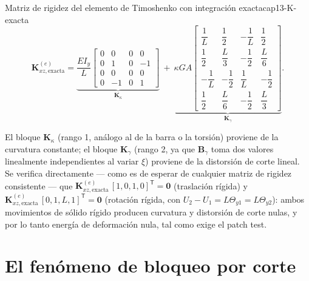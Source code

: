 \begin{ecnimportante}{Matriz de rigidez del elemento de Timoshenko con integración exacta}{cap13-K-exacta}
\[
\bm K^{(e)}_{xz,\text{exacta}} =
\underbrace{\frac{EI_y}{L}\begin{bmatrix}0&0&0&0\\0&1&0&-1\\0&0&0&0\\0&-1&0&1\end{bmatrix}}_{\bm K_\kappa}
\ +\
\underbrace{\kappa GA\begin{bmatrix}
\dfrac1L & \dfrac12 & -\dfrac1L & \dfrac12 \\[4pt]
\dfrac12 & \dfrac{L}{3} & -\dfrac12 & \dfrac{L}{6} \\[4pt]
-\dfrac1L & -\dfrac12 & \dfrac1L & -\dfrac12 \\[4pt]
\dfrac12 & \dfrac{L}{6} & -\dfrac12 & \dfrac{L}{3}
\end{bmatrix}}_{\bm K_\gamma} .
\]
\end{ecnimportante}

El bloque $\bm K_\kappa$ (rango 1, análogo al de la barra o la torsión) proviene de la curvatura constante; el bloque $\bm K_\gamma$ (rango 2, ya que $\bm B_\gamma$ toma dos valores linealmente independientes al variar $\xi$) proviene de la distorsión de corte lineal. Se verifica directamente --- como es de esperar de cualquier matriz de rigidez consistente --- que $\bm K^{(e)}_{xz,\text{exacta}}\,[1,0,1,0]^{\mathsf T}=\bm 0$ (traslación rígida) y $\bm K^{(e)}_{xz,\text{exacta}}\,[0,1,L,1]^{\mathsf T}=\bm 0$ (rotación rígida, con $U_2-U_1=L\Theta_{y1}=L\Theta_{y2}$): ambos movimientos de sólido rígido producen curvatura y distorsión de corte nulas, y por lo tanto energía de deformación nula, tal como exige el patch test.

\section{El fenómeno de bloqueo por corte}
\label{sec:cap13-bloqueo-corte}

